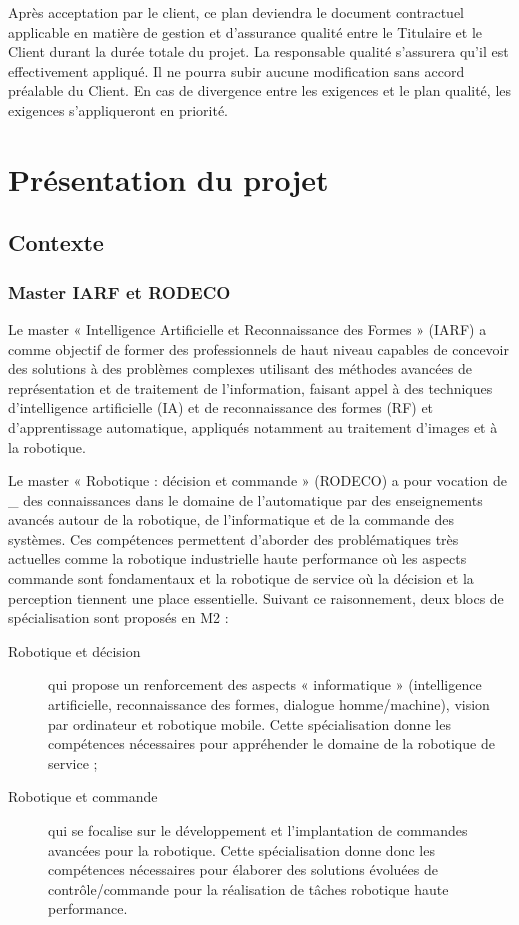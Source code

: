 \documentclass[10pt,a4paper]{article}
\begin{document}
Après acceptation par le client, ce plan deviendra le document contractuel applicable en matière de gestion et d’assurance qualité entre le Titulaire et le Client durant la durée totale du projet. La responsable qualité s’assurera qu’il est effectivement appliqué. Il ne pourra subir aucune modification sans accord préalable du Client. En cas de divergence entre les exigences et le plan qualité, les exigences s’appliqueront en priorité.


\section{Présentation du projet}
\label{sec:presentation}

\subsection{Contexte}

\subsubsection{Master IARF et RODECO}

Le master « Intelligence Artificielle et Reconnaissance des Formes » (IARF) a comme objectif de former des professionnels de haut niveau capables de concevoir des solutions à des problèmes complexes utilisant des méthodes avancées de représentation et de traitement de l’information, faisant appel à des techniques d’intelligence artificielle (IA) et de reconnaissance des formes (RF) et d’apprentissage automatique, appliqués notamment au traitement d’images et à la robotique. 

Le master « Robotique : décision et commande » (RODECO) a pour vocation de \_ des connaissances dans le domaine de l’automatique par des enseignements avancés autour de la robotique, de l’informatique et de la commande des systèmes. Ces compétences permettent d’aborder des problématiques très actuelles comme la robotique industrielle haute performance où les aspects commande sont fondamentaux et la robotique  de service où la décision et la perception tiennent une place essentielle. Suivant ce raisonnement, deux blocs de spécialisation sont proposés en M2 : 

\begin{description}
\item [Robotique et décision] qui propose un renforcement des aspects « informatique » (intelligence artificielle, reconnaissance des formes, dialogue homme/machine), vision par ordinateur et robotique  mobile. Cette spécialisation donne les compétences nécessaires pour appréhender le domaine de la robotique de service ;
\item [Robotique et commande] qui se focalise sur le développement et l’implantation de commandes avancées pour la robotique. Cette spécialisation donne donc les compétences nécessaires pour élaborer des solutions évoluées de contrôle/commande pour la réalisation de tâches robotique haute performance.
\end{description}
\end{document}
